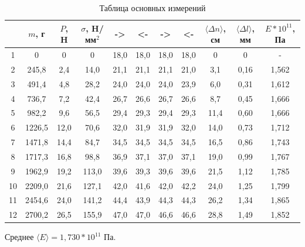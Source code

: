 \documentclass[a4paper]{article}
\begin{document}
\begin{table}[h!]
\begin{center}
\begin{tabular}{|c|c|c|c|c|c|c|c|c|c|c|}
\hline
&$m$, г & $P$, H & $\sigma$, H/мм$^2$ & -> & <- & -> & <- & $\langle \Delta n \rangle$, см & $\langle \Delta l \rangle$, мм & $E * 10^{11}$, Па\\ \hline

1   & 0        & 0    & 0      & 18,0   & 18,0   & 18,0   & 18,0  & 0     & 0     & -     \\ \hline
2   & 245,8    & 2,4  & 14,0   & 21,1   & 21,1   & 21,1   & 21,0  & 3,1   & 0,16  & 1,562         \\ \hline
3   & 491,4    & 4,8  & 28,2   & 24,0   & 24,0   & 24,0   & 23,9  & 6,0   & 0,31  & 1,612 \\ \hline
4   & 736,7    & 7,2  & 42,4   & 26,7   & 26,6   & 26,7   & 26,6  & 8,7   & 0,45  & 1,666  \\ \hline
5   & 982,2    & 9,6  & 56,5   & 29,4   & 29,3   & 29,4   & 29,3  & 11,4  & 0,60  & 1,666  \\ \hline
6   & 1226,5   & 12,0 & 70,6   & 32,0   & 31,9   & 31,9   & 32,0  & 14,0  & 0,73  & 1,712  \\ \hline
7   & 1471,8   & 14,4 & 84,7   & 34,5   & 34,5   & 34,5   & 34,5  & 16,5  & 0,86  & 1,743   \\ \hline
8   & 1717,3   & 16,8 & 98,8   & 36,9   & 37,1   & 37,0   & 37,1  & 19,0  & 0,99  & 1,767 \\ \hline
9   & 1962,9   & 19,2 & 113,0  & 39,6   & 39,3   & 39,6   & 39,6  & 21,5  & 1,12  & 1,785    \\ \hline
10  & 2209,0   & 21,6 & 127,1  & 42,0   & 41,6   & 42,0   & 42,2  & 24,0  & 1,25  & 1,799  \\ \hline
11  & 2454,6   & 24,0 & 141,2  & 44,4   & 43,9   & 44,3   & 44,3  & 26,2  & 1,34  & 1,865  \\ \hline
12  & 2700,2   & 26,5 & 155,9  & 47,0   & 47,0   & 46,6   & 46,6  & 28,8  & 1,49  & 1,852   \\ \hline

\end{tabular}
\caption{Таблица основных измерений}
\end{center}
\end{table}

\item Среднее $\langle E \rangle = 1,730 * 10^{11}$ Па.\\
\end{document}
